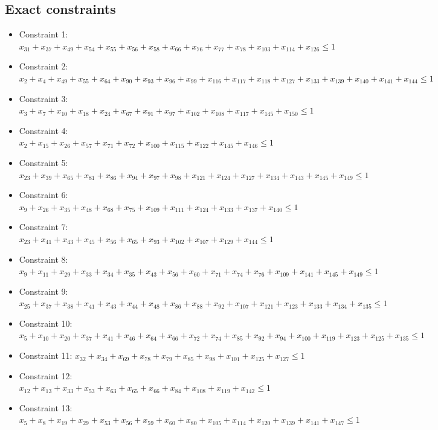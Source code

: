 \documentclass[11pt]{article}
\begin{document}
\subsection*{Exact constraints}
\begin{itemize}
\item Constraint 1: $x_{31} + x_{37} + x_{49} + x_{54} + x_{55} + x_{56} + x_{58} + x_{66} + x_{76} + x_{77} + x_{78} + x_{103} + x_{114} + x_{126} \le 1$
\item Constraint 2: $x_{2} + x_{4} + x_{49} + x_{55} + x_{64} + x_{90} + x_{93} + x_{96} + x_{99} + x_{116} + x_{117} + x_{118} + x_{127} + x_{133} + x_{139} + x_{140} + x_{141} + x_{144} \le 1$
\item Constraint 3: $x_{3} + x_{7} + x_{10} + x_{18} + x_{24} + x_{67} + x_{91} + x_{97} + x_{102} + x_{108} + x_{117} + x_{145} + x_{150} \le 1$
\item Constraint 4: $x_{2} + x_{15} + x_{26} + x_{57} + x_{71} + x_{72} + x_{100} + x_{115} + x_{122} + x_{145} + x_{146} \le 1$
\item Constraint 5: $x_{23} + x_{39} + x_{65} + x_{81} + x_{86} + x_{94} + x_{97} + x_{98} + x_{121} + x_{124} + x_{127} + x_{134} + x_{143} + x_{145} + x_{149} \le 1$
\item Constraint 6: $x_{9} + x_{26} + x_{35} + x_{48} + x_{68} + x_{75} + x_{109} + x_{111} + x_{124} + x_{133} + x_{137} + x_{140} \le 1$
\item Constraint 7: $x_{23} + x_{41} + x_{43} + x_{45} + x_{56} + x_{65} + x_{93} + x_{102} + x_{107} + x_{129} + x_{144} \le 1$
\item Constraint 8: $x_{9} + x_{11} + x_{29} + x_{33} + x_{34} + x_{35} + x_{43} + x_{56} + x_{60} + x_{71} + x_{74} + x_{76} + x_{109} + x_{141} + x_{145} + x_{149} \le 1$
\item Constraint 9: $x_{25} + x_{37} + x_{38} + x_{41} + x_{43} + x_{44} + x_{48} + x_{86} + x_{88} + x_{92} + x_{107} + x_{121} + x_{123} + x_{133} + x_{134} + x_{135} \le 1$
\item Constraint 10: $x_{5} + x_{10} + x_{20} + x_{37} + x_{41} + x_{46} + x_{64} + x_{66} + x_{72} + x_{74} + x_{85} + x_{92} + x_{94} + x_{100} + x_{119} + x_{123} + x_{125} + x_{135} \le 1$
\item Constraint 11: $x_{32} + x_{34} + x_{69} + x_{78} + x_{79} + x_{85} + x_{98} + x_{101} + x_{125} + x_{127} \le 1$
\item Constraint 12: $x_{12} + x_{13} + x_{33} + x_{53} + x_{63} + x_{65} + x_{66} + x_{84} + x_{108} + x_{119} + x_{142} \le 1$
\item Constraint 13: $x_{5} + x_{8} + x_{19} + x_{29} + x_{53} + x_{56} + x_{59} + x_{60} + x_{80} + x_{105} + x_{114} + x_{120} + x_{139} + x_{141} + x_{147} \le 1$

\end{itemize}
\end{document}
